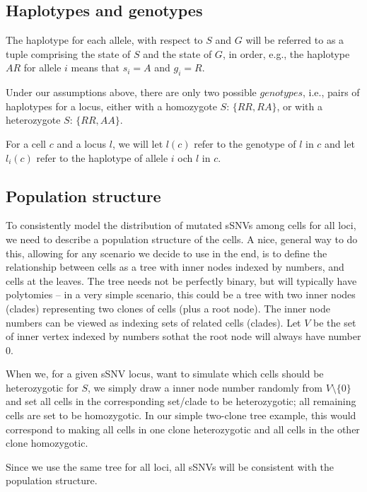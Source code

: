 \documentclass[a4paper,11pt]{article}
\begin{document}
\subsection{Haplotypes and genotypes}
\label{sec:haplotypes-genotypes}

The haplotype for each allele, with respect to $S$ and $G$ will be
referred to as a tuple comprising the state of $S$ and the state of
$G$, in order, e.g., the haplotype $AR$ for allele
$i$ means that $s_i=A$ and $g_i=R$.

Under our assumptions above, there are only two possible $genotypes$,
i.e., pairs of haplotypes for a locus, either with a homozygote $S$:
$\{RR,RA\}$, or with a heterozygote $S$: $\{RR,AA\}$.

For a cell $c$ and a locus $l$, we will let $l(c)$ refer to the
genotype of $l$ in $c$ and let $l_i(c)$ refer to the haplotype of
allele $i$ och $l$ in $c$.


\subsection{Population structure}
\label{sec:population-structure}

To consistently model the distribution of mutated sSNVs among cells
for all loci, we need to describe a population structure of the cells.
A nice, general way to do this, allowing for any scenario we decide to
use in the end, is to define the relationship between cells as a tree
with inner nodes indexed by numbers, and cells at the leaves. The tree
needs not be perfectly binary, but will typically have polytomies --
in a very simple scenario, this could be a tree with two inner nodes
(clades) representing two clones of cells (plus a root node). The
inner node numbers can be viewed as indexing sets of related cells
(clades). Let $V$ be the set of inner vertex indexed by numbers sothat
the root node will always have number $0$.

When we, for a given sSNV locus, want to simulate which cells should
be heterozygotic for $S$, we simply draw a inner node number randomly
from $V\setminus \{0\}$ and set all cells in the corresponding
set/clade to be heterozygotic; all remaining cells are set to be
homozygotic.  In our simple two-clone tree example, this would
correspond to making all cells in one clone heterozygotic and all
cells in the other clone homozygotic.

Since we use the same tree for all loci, all sSNVs will be consistent
with the population structure.
\end{document}
